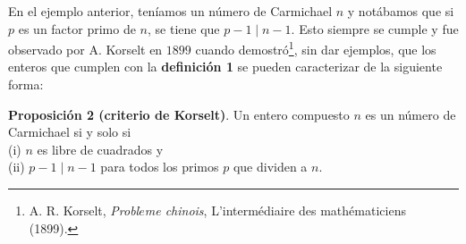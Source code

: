 \documentclass{article}
\theoremstyle{definition}
\begin{document}
En el ejemplo anterior, teníamos un número de Carmichael $n$ y notábamos que si $p$ es un factor primo de $n$, se tiene que $p-1 \mid n - 1$. Esto siempre se cumple y fue observado por  A. Korselt en $1899$ cuando demostró\footnote{ A. R. Korselt, \textit{Probl$\grave{e}$me chinois}, L'intermédiaire des mathématiciens  (1899). }, sin dar ejemplos, que los enteros que cumplen con la \textbf{definición 1} se pueden caracterizar de la siguiente forma:
\newpage
\begin{mybox2}
\textbf{Proposición 2 (criterio de Korselt)}.
	 Un entero compuesto $n$ es un número de Carmichael si y solo si \\	
	(i) $n$ es libre de cuadrados y \\ 
	(ii) $p-1 \mid n-1$ para todos los primos $p$ que dividen a $n$.	
\end{mybox2}	
\end{document}
